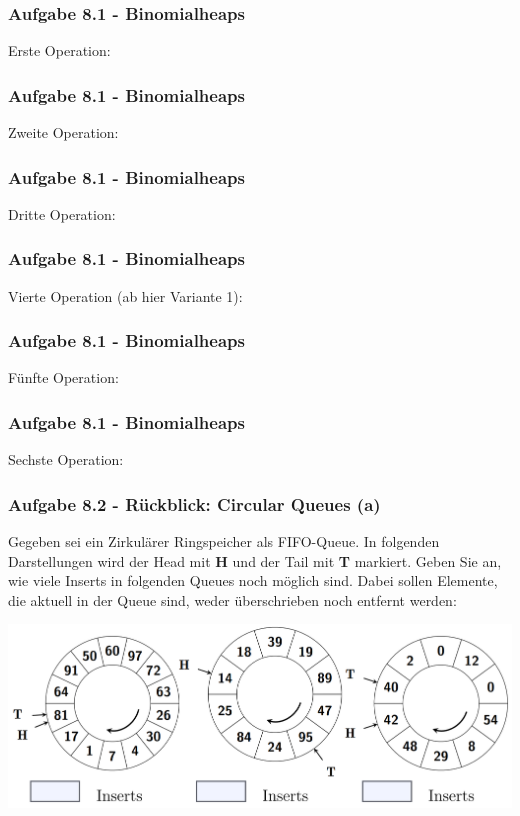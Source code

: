 \documentclass{beamer}
\begin{document}
\begin{frame}[t]
	\frametitle{Aufgabe 8.1 -  Binomialheaps}
	Erste Operation:
\end{frame}

\begin{frame}[t]
	\frametitle{Aufgabe 8.1 -  Binomialheaps}
	Zweite Operation:
\end{frame}

\begin{frame}[t]
	\frametitle{Aufgabe 8.1 -  Binomialheaps}
	Dritte Operation:
\end{frame}

\begin{frame}[t]
	\frametitle{Aufgabe 8.1 -  Binomialheaps}
	Vierte Operation (ab hier Variante 1):
\end{frame}

\begin{frame}[t]
	\frametitle{Aufgabe 8.1 -  Binomialheaps}
	Fünfte Operation:
\end{frame}

\begin{frame}[t]
	\frametitle{Aufgabe 8.1 -  Binomialheaps}
	Sechste Operation:
\end{frame}

\begin{frame}[t]
	\frametitle{Aufgabe 8.2 - Rückblick: Circular Queues (a)}
	{\small
		Gegeben sei ein Zirkulärer Ringspeicher als FIFO-Queue. In folgenden Darstellungen
		wird der Head mit \textbf{H} und der Tail mit \textbf{T} markiert. Geben Sie an, wie viele Inserts in
		folgenden Queues noch möglich sind. Dabei sollen Elemente, die aktuell in der Queue
		sind, weder überschrieben noch entfernt werden:
	}

	\medskip

	\includegraphics[width=\textwidth]{images/circular_queue_a.png}
\end{frame}
\end{document}

